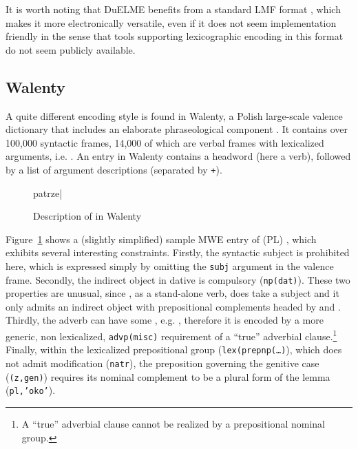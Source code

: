 \documentclass[output=paper
,modfonts
,nonflat
,biblatexbackend=biber
]{langsci/langscibook}
\begin{document}
It is worth noting that DuELME benefits from a standard LMF format \citep{odijk:13}, which makes it more electronically versatile, even if it does not seem implementation friendly in the sense that tools supporting lexicographic encoding in this format do not seem publicly available.

\subsection{Walenty}
\label{lic:sec:walenty}

A quite different encoding style is found in Walenty, a Polish large-scale valence dictionary that includes an elaborate phraseological component \citep{prz:etal:14b,prz:etal:16}. It contains over 100,000 syntactic frames, 14,000 of which are verbal frames with lexicalized arguments, i.e. . An entry in Walenty contains a headword (here a verb), followed by a list of argument descriptions (separated by \texttt{+}).

\begin{figure}[th]
\begin{duelme}
patrze|%
\end{duelme}
  \caption{Description of  in Walenty}
  \label{lic:fig:patrzy:walenty}
\end{figure}

Figure~\ref{lic:fig:patrzy:walenty} shows a (slightly simplified) sample MWE entry of (PL) , which exhibits several interesting constraints. Firstly, the syntactic subject is prohibited here, which is expressed simply by omitting the \texttt{subj} argument in the valence frame. Secondly, the indirect object in dative is compulsory (\texttt{np(dat)}). These two properties are unusual, since , as a stand-alone verb, does take a subject and it only admits an indirect object with prepositional complements headed by  and . Thirdly, the adverb  can have some , e.g. , therefore it is encoded by a more generic, non lexicalized, \texttt{advp(misc)} requirement of a ``true'' adverbial clause.\footnote{A ``true'' adverbial clause cannot be realized by a prepositional nominal group.} 
Finally, within the lexicalized prepositional group (\texttt{lex(prepnp(\ldots)}), which does not admit modification (\texttt{natr}), the preposition  governing the genitive case (\texttt{(z,gen)}) requires its nominal complement to be a plural form of the lemma  (\texttt{pl,'oko'}).
\end{document}

